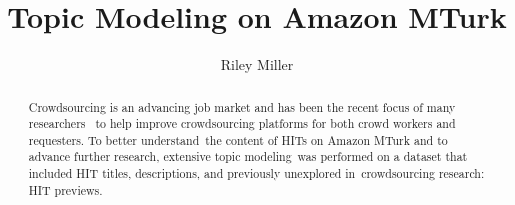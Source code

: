 \documentclass[letterpaper,12pt]{article}
\title{Topic Modeling on Amazon MTurk}
\author{Riley Miller}
\begin{document}


\frontmatter


\maketitle
\newpage


\makecopyright{\the\year}
\newpage


\makesubmittal
\newpage


\begin{abstract}
Crowdsourcing is an advancing job market and has been the recent focus of many researchers \
to help improve crowdsourcing platforms for both crowd workers and requesters. To better understand\
the content of HITs on Amazon MTurk and to advance further research, extensive topic modeling\
was performed on a dataset that included HIT titles, descriptions, and previously unexplored in\
crowdsourcing research: HIT previews.
\end{abstract}

\newpage


\tableofcontents
\newpage



\listoffigures
\newpage
\listoftables
\newpage


\end{document}
